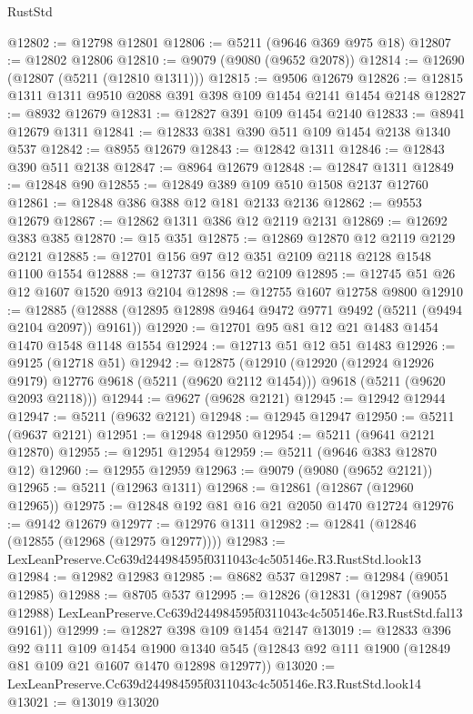 \begin{lexlean}{RustStd}
\begin{coremodule}
@12802 := @12798 @12801
@12806 := @5211 (@9646 @369 @975 @18)
@12807 := @12802 @12806
@12810 := @9079 (@9080 (@9652 @2078))
@12814 := @12690 (@12807 (@5211 (@12810 @1311)))
@12815 := @9506 @12679
@12826 := @12815 @1311 @1311 @9510 @2088 @391 @398 @109 @1454 @2141 @1454 @2148
@12827 := @8932 @12679
@12831 := @12827 @391 @109 @1454 @2140
@12833 := @8941 @12679 @1311
@12841 := @12833 @381 @390 @511 @109 @1454 @2138 @1340 @537
@12842 := @8955 @12679
@12843 := @12842 @1311
@12846 := @12843 @390 @511 @2138
@12847 := @8964 @12679
@12848 := @12847 @1311
@12849 := @12848 @90
@12855 := @12849 @389 @109 @510 @1508 @2137 @12760
@12861 := @12848 @386 @388 @12 @181 @2133 @2136
@12862 := @9553 @12679
@12867 := @12862 @1311 @386 @12 @2119 @2131
@12869 := @12692 @383 @385
@12870 := @15 @351
@12875 := @12869 @12870 @12 @2119 @2129 @2121
@12885 := @12701 @156 @97 @12 @351 @2109 @2118 @2128 @1548 @1100 @1554
@12888 := @12737 @156 @12 @2109
@12895 := @12745 @51 @26 @12 @1607 @1520 @913 @2104
@12898 := @12755 @1607 @12758 @9800
@12910 := @12885 (@12888 (@12895 @12898 @9464 @9472 @9771 @9492 (@5211 (@9494 @2104 @2097)) @9161))
@12920 := @12701 @95 @81 @12 @21 @1483 @1454 @1470 @1548 @1148 @1554
@12924 := @12713 @51 @12 @51 @1483
@12926 := @9125 (@12718 @51)
@12942 := @12875
    (@12910
      (@12920 (@12924 @12926 @9179) @12776 @9618 (@5211 (@9620 @2112 @1454)))
      @9618
      (@5211 (@9620 @2093 @2118)))
@12944 := @9627 (@9628 @2121)
@12945 := @12942 @12944
@12947 := @5211 (@9632 @2121)
@12948 := @12945 @12947
@12950 := @5211 (@9637 @2121)
@12951 := @12948 @12950
@12954 := @5211 (@9641 @2121 @12870)
@12955 := @12951 @12954
@12959 := @5211 (@9646 @383 @12870 @12)
@12960 := @12955 @12959
@12963 := @9079 (@9080 (@9652 @2121))
@12965 := @5211 (@12963 @1311)
@12968 := @12861 (@12867 (@12960 @12965))
@12975 := @12848 @192 @81 @16 @21 @2050 @1470 @12724
@12976 := @9142 @12679
@12977 := @12976 @1311
@12982 := @12841 (@12846 (@12855 (@12968 (@12975 @12977))))
@12983 := LexLeanPreserve.Cc639d244984595f0311043c4c505146e.R3.RustStd.look13
@12984 := @12982 @12983
@12985 := @8682 @537
@12987 := @12984 (@9051 @12985)
@12988 := @8705 @537
@12995 := @12826
    (@12831
      (@12987
        (@9055 @12988)
        LexLeanPreserve.Cc639d244984595f0311043c4c505146e.R3.RustStd.fal13
        @9161))
@12999 := @12827 @398 @109 @1454 @2147
@13019 := @12833
    @396
    @92
    @111
    @109
    @1454
    @1900
    @1340
    @545
    (@12843 @92 @111 @1900 (@12849 @81 @109 @21 @1607 @1470 @12898 @12977))
@13020 := LexLeanPreserve.Cc639d244984595f0311043c4c505146e.R3.RustStd.look14
@13021 := @13019 @13020

\end{coremodule}
\end{lexlean}
